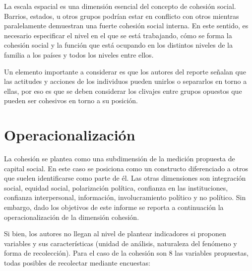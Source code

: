 \documentclass[
  12pt,
]{book}
\begin{document}
La escala espacial es una dimensión esencial del concepto de cohesión
social. Barrios, estados, u otros grupos podrían estar en conflicto con
otros mientras paralelamente demuestran una fuerte cohesión social
interna. En este sentido, es necesario especificar el nivel en el que se
está trabajando, cómo se forma la cohesión social y la función que está
ocupando en los distintos niveles de la familia a los países y todos los
niveles entre ellos.

Un elemento importante a considerar es que los autores del reporte
señalan que las actitudes y acciones de los individuos pueden unirlos o
separarlos en torno a ellas, por eso es que se deben considerar los
clivajes entre grupos opuestos que pueden ser cohesivos en torno a su
posición.

\hypertarget{operacionalizaciuxf3n-3}{%
\section{Operacionalización}\label{operacionalizaciuxf3n-3}}

La cohesión se plantea como una subdimensión de la medición propuesta de
capital social. En este caso se posiciona como un constructo
diferenciado a otros que suelen identificarse como parte de él. Las
otras dimensiones son integración social, equidad social, polarización
política, confianza en las instituciones, confianza interpersonal,
información, involucramiento político y no político. Sin embargo, dado
los objetivos de este informe se reporta a continuación la
operacionalización de la dimensión cohesión.

Si bien, los autores no llegan al nivel de plantear indicadores si
proponen variables y sus características (unidad de análisis, naturaleza
del fenómeno y forma de recolección). Para el caso de la cohesión son 8
las variables propuestas, todas posibles de recolectar mediante
encuestas:
\end{document}
